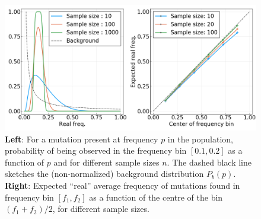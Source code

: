 \documentclass[reprint,amsmath,amssymb,superscriptaddress,showpacs,rmp]{revtex4-1}
\begin{document}
	\begin{figure}
		\centering
		\includegraphics[scale=0.5]{SM_figures/frequency_biases.png}
		\caption{\textbf{Left}: For a mutation present at frequency $p$ in the population, probability of being observed in the frequency bin $[0.1, 0.2]$ as a function of $p$ and for different sample sizes $n$. The dashed black line sketches the (non-normalized) background distribution $P_b(p)$. \textbf{Right}: Expected ``real'' average frequency of mutations found in frequency bin $[f_1,f_2]$ as a function of the centre of the bin $(f_1+f_2)/2$, for different sample sizes.}
		\label{fig:freq_biases}
	\end{figure}
\end{document}
